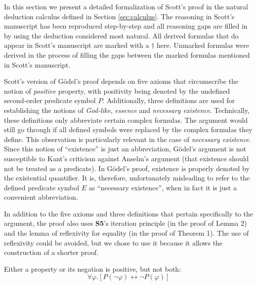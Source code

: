 \documentclass[smallextended]{svjour3}
\newcommand{\biimp}{\leftrightarrow}
\newcommand{\all}{\forall}
\begin{document}
\newcommand{\scott}{^{\dagger}}


In this section we present a detailed formalization of Scott's proof in the natural deduction calculus defined in Section \ref{sec:calculus}. The reasoning in Scott's manuscript has been reproduced step-by-step and all reasoning gaps are filled in by using the deduction considered most natural. All derived formulas that do appear in Scott's manuscript are marked with a $\dagger$ here. Unmarked formulas were derived in the process of filling the gaps between the marked formulas mentioned in Scott's manuscript. 


Scott's version of G\"odel's proof depends on five axioms that circumscribe the notion of \emph{positive} property, with positivity being denoted by the undefined second-order predicate symbol $P$. Additionally, three definitions are used for establishing the notions of \emph{God-like}, \emph{essence} and \emph{necessary existence}. Technically, these definitions only abbreviate certain complex formulas. The argument would still go through if all defined symbols were replaced by the complex formulas they define. This observation is particularly relevant in the case of \emph{necessary existence}. Since this notion of ``existence'' is just an abbreviation, G\"odel's argument is not susceptible to Kant's criticism against Anselm's argument (that existence should not be treated as a predicate). In G\"odel's proof, existence is properly denoted by the existential quantifier. It is, therefore, unfortunately misleading to refer to the defined predicate symbol $E$ as ``necessary existence'', when in fact it is just a convenient abbreviation.

In addition to the five axioms and three definitions that pertain specifically to the argument, the proof also uses {\bf S5}'s iteration principle (in the proof of Lemma 2) and the lemma of reflexivity for equality (in the proof of Theorem 1). The use of reflexivity could be avoided, but we chose to use it because it allows the construction of a shorter proof. 


\begin{axiom}
\label{A1}
Either a property or its negation is positive, but not both:
$$
\all \varphi. [P(\neg \varphi) \biimp \neg P(\varphi)]
$$
\end{axiom}
\end{document}
